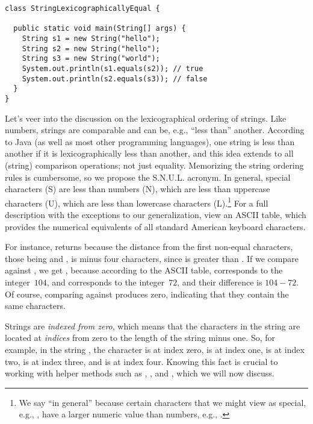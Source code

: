 \begin{lstlisting}[language=MyJava]
class StringLexicographicallyEqual {

  public static void main(String[] args) {
    String s1 = new String("hello");
    String s2 = new String("hello");
    String s3 = new String("world");
    System.out.println(s1.equals(s2)); // true
    System.out.println(s2.equals(s3)); // false
  }
}
\end{lstlisting}

Let's veer into the discussion on the lexicographical ordering of strings. 
Like numbers, strings are comparable and can be, e.g., ``less than'' another. 
According to Java (as well as most other programming languages), one string is less than another if it is lexicographically less than another, and this idea extends to all (string) comparison operations; not just equality. 
Memorizing the string ordering rules is cumbersome, so we propose the S.N.U.L. acronym. 
In general, special characters (S) are less than numbers (N), which are less than uppercase characters (U), which are less than lowercase characters (L).\footnote{We say ``in general'' because certain characters that we might view as special, e.g., , have a larger numeric value than numbers, e.g., .} 
For a full description with the exceptions to our generalization, view an ASCII table, which provides the numerical equivalents of all standard American keyboard characters. 

For instance,  returns  because the distance from the first non-equal characters, those being  and , is minus four characters, since  is greater than . 
If we compare  against , we get , because according to the ASCII table,  corresponds to the integer~$104$, and  corresponds to the integer~$72$, and their difference is $104 - 72$. 
Of course, comparing  against  produces zero, indicating that they contain the same characters.

Strings are \emph{indexed from zero}, which means that the characters in the string are located at \emph{indices} from zero to the length of the string minus one. 
So, for example, in the string , the character  is at index zero,  is at index one,  is at index two,  is at index three, and  is at index four. 
Knowing this fact is crucial to working with helper methods such as , , and , which we will now discuss.

